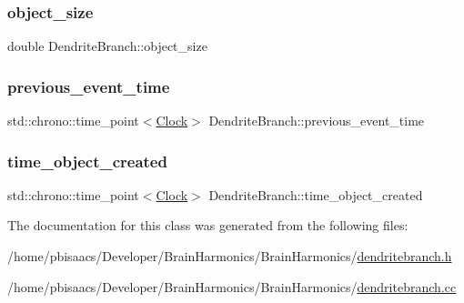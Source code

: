\mbox{\label{classDendriteBranch_a19c3bd5c518cf8b4fdae49586ad0df4b}} 
\subsubsection{\texorpdfstring{object\+\_\+size}{object\_size}}
{\footnotesize\ttfamily double Dendrite\+Branch\+::object\+\_\+size\hspace{0.3cm}{\ttfamily [private]}}

\mbox{\label{classDendriteBranch_a16bdc976d615cf2b1b5e3238241e19b6}} 
\subsubsection{\texorpdfstring{previous\+\_\+event\+\_\+time}{previous\_event\_time}}
{\footnotesize\ttfamily std\+::chrono\+::time\+\_\+point$<$\mbox{\hyperlink{universe_8h_a0ef8d951d1ca5ab3cfaf7ab4c7a6fd80}{Clock}}$>$ Dendrite\+Branch\+::previous\+\_\+event\+\_\+time\hspace{0.3cm}{\ttfamily [private]}}

\mbox{\label{classDendriteBranch_a253b94811cb4a0697446dc3d572f91de}} 
\subsubsection{\texorpdfstring{time\+\_\+object\+\_\+created}{time\_object\_created}}
{\footnotesize\ttfamily std\+::chrono\+::time\+\_\+point$<$\mbox{\hyperlink{universe_8h_a0ef8d951d1ca5ab3cfaf7ab4c7a6fd80}{Clock}}$>$ Dendrite\+Branch\+::time\+\_\+object\+\_\+created\hspace{0.3cm}{\ttfamily [private]}}



The documentation for this class was generated from the following files\+:\begin{DoxyCompactItemize}
\item 
/home/pbisaacs/\+Developer/\+Brain\+Harmonics/\+Brain\+Harmonics/\mbox{\hyperlink{dendritebranch_8h}{dendritebranch.\+h}}\item 
/home/pbisaacs/\+Developer/\+Brain\+Harmonics/\+Brain\+Harmonics/\mbox{\hyperlink{dendritebranch_8cc}{dendritebranch.\+cc}}\end{DoxyCompactItemize}
